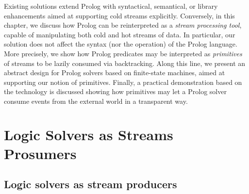 \documentclass[12pt,a4paper,openright,twoside]{book}
\begin{document}
Existing solutions extend Prolog with syntactical, semantical, or library enhancements aimed at supporting cold streams explicitly.
%
Conversely, in this chapter, we discuss how Prolog can be reinterpreted as a \emph{stream processing tool}, capable of manipulating both cold and hot streams of data.
%
In particular, our solution does not affect the syntax (nor the operation) of the Prolog language.
%
More precisely, we show how Prolog predicates may be interpreted as \emph{primitives} of streams to be lazily consumed via backtracking.
%
Along this line, we present an abstract design for Prolog solvers based on finite-state machines, aimed at supporting our notion of primitives.
%
Finally, a practical demonstration based on the \twopkt{} technology \cite{homepage2PKt} is discussed showing how primitives may let a Prolog solver consume events from the external world in a transparent way.


\section{Logic Solvers as Streams Prosumers}\label{sec:primitives}

\subsection{Logic solvers as stream producers}
\end{document}
